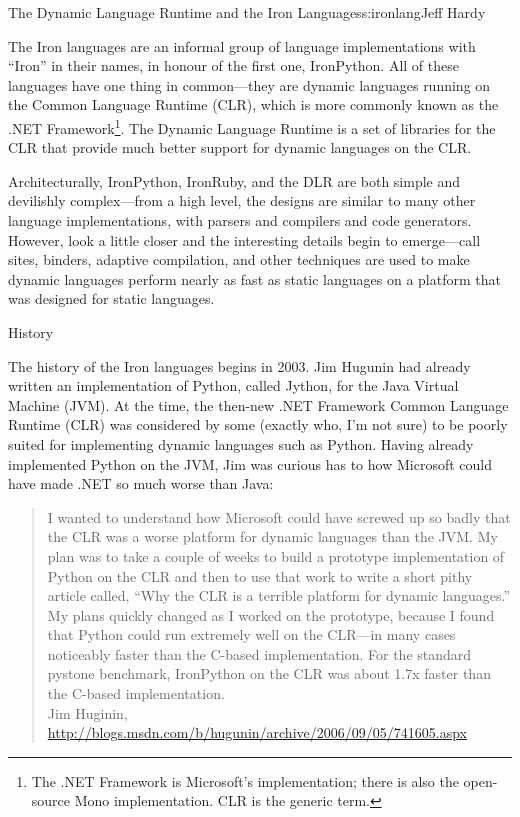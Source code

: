 \begin{aosachapter}{The Dynamic Language Runtime and the Iron Languages}{s:ironlang}{Jeff Hardy}

The Iron languages are an informal group of language implementations
with ``Iron'' in their names, in honour of the first one,
IronPython. All of these languages have one thing in common---they are
dynamic languages running on the Common Language Runtime (CLR), which
is more commonly known as the .NET Framework\footnote{The .NET
Framework is Microsoft's implementation; there is also the
open-source Mono implementation. CLR is the generic term.}. The
Dynamic Language Runtime is a set of libraries for the CLR that
provide much better support for dynamic languages on the CLR.

Architecturally, IronPython, IronRuby, and the DLR are both simple and
devilishly complex---from a high level, the designs are similar to
many other language implementations, with parsers and compilers and
code generators. However, look a little closer and the interesting
details begin to emerge---call sites, binders, adaptive compilation,
and other techniques are used to make dynamic languages perform nearly
as fast as static languages on a platform that was designed for static
languages.

\begin{aosasect1}{History}

The history of the Iron languages begins in 2003. Jim Hugunin had
already written an implementation of Python, called Jython, for the
Java Virtual Machine (JVM). At the time, the then-new .NET Framework
Common Language Runtime (CLR) was considered by some (exactly who, I'm
not sure) to be poorly suited for implementing dynamic languages such
as Python. Having already implemented Python on the JVM, Jim was
curious has to how Microsoft could have made .NET so much worse than
Java:

\begin{quotation}
I wanted to understand how Microsoft could have screwed up so badly
that the CLR was a worse platform for dynamic languages than the JVM.
My plan was to take a couple of weeks to build a prototype
implementation of Python on the CLR and then to use that work to write
a short pithy article called, ``Why the CLR is a terrible platform for
dynamic languages.''  My plans quickly changed as I worked on the
prototype, because I found that Python could run extremely well on the
CLR---in many cases noticeably faster than the C-based implementation.
For the standard pystone benchmark, IronPython on the CLR was about
1.7x faster than the C-based implementation.\\ Jim Huginin,
\url{http://blogs.msdn.com/b/hugunin/archive/2006/09/05/741605.aspx}
\end{quotation}


\end{aosasect1}
\end{aosachapter}
